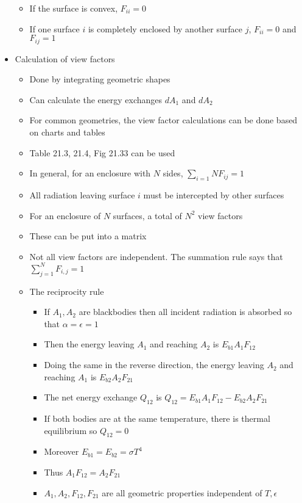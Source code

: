 \documentclass[12pt]{article}
\begin{document}
\begin{itemize}
\begin{itemize}
        \item If the surface is convex, $F_{ii} = 0$
        \item If one surface $i$ is completely enclosed by another surface $j$, $F_{ii} = 0$ and $F_{ij} = 1$
    \end{itemize}
    \item Calculation of view factors \begin{itemize}
        \item Done by integrating geometric shapes
        \item Can calculate the energy exchanges $dA_1$ and $dA_2$
        \item For common geometries, the view factor calculations can be done based on charts and tables 
        \item Table 21.3, 21.4, Fig 21.33 can be used 
        \item In general, for an enclosure with $N$ sides, $\sum_{i=1}{N} F_{ij} = 1$
        \item All radiation leaving surface $i$ must be intercepted by other surfaces
        \item For an enclosure of $N$ surfaces, a total of $N^2$ view factors 
        \item These can be put into a matrix
        \item Not all view factors are independent. The summation rule says that $\sum_{j=1}^{N} F_{i,j} = 1$
        \item The reciprocity rule \begin{itemize} 
            \item If $A_1, A_2$ are blackbodies then all incident radiation is absorbed so that $\alpha = \epsilon = 1$
            \item Then the energy leaving $A_1$ and reaching $A_2$ is $E_{b1} A_1 F_{12}$
            \item Doing the same in the reverse direction, the energy leaving $A_2$ and reaching $A_1$ is $E_{b2} A_2 F_{21}$
            \item The net energy exchange $Q_{12}$ is $Q_{12} = E_{b1} A_1 F_{12} - E_{b2} A_2 F_{21}$
            \item If both bodies are at the same temperature, there is thermal equilibrium so $Q_{12}  =0$
            \item Moreover $E_{b1} = E_{b2} = \sigma T^4$
            \item Thus $A_1 F_{12} = A_2 F_{21}$ 
            \item $A_1, A_2, F_{12}, F_{21}$ are all geometric properties independent of $T, \epsilon$

\end{itemize}
\end{itemize}
\end{itemize}
\end{document}
